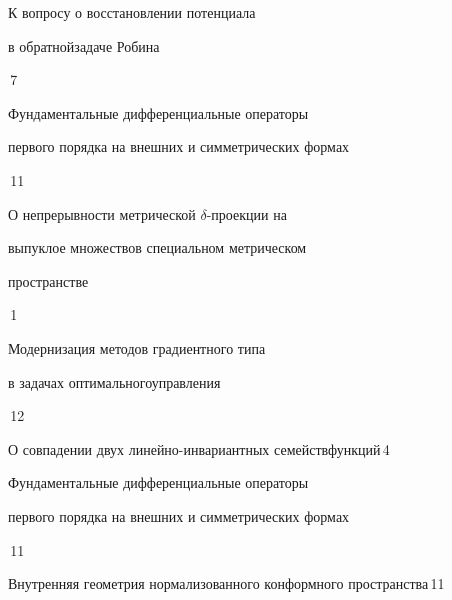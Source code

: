



{К вопросу о восстановлении потенциала 


в обратной\newline задаче Робина}{\No\,7}






{Фундаментальные дифференциальные операторы\newline


первого порядка на внешних и симметрических формах}{\No\,11}




{О непрерывности метрической $\delta$-проекции на 


выпуклое множество\newline в специальном метрическом


пространстве}{\No\,1}




{Модернизация методов градиентного типа 


в задачах оптимального\newline управления}{\No\,12}




{О совпадении двух линейно-инвариантных семейств\newline функций}{\No\,4}




{Фундаментальные дифференциальные операторы\newline


первого порядка на внешних и симметрических формах}{\No\,11}






{Внутренняя геометрия нормализованного конформного пространства}{\No\,11}


